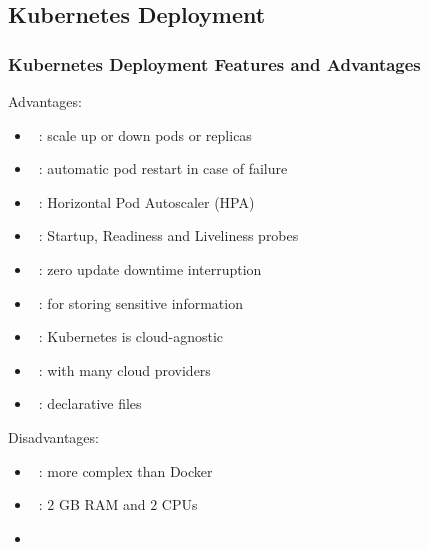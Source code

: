 \documentclass[xcolor=table,fontsize=10pt]{beamer}
\newcommand{\checkeditem}{\item[$\textcolor{green}{\checkmark}$]}
\newcommand{\negitem}{\item[\red{\faIcon{minus}}]}
\begin{document}
\begin{frame}
\begin{center}
\begin{adjustbox}{max width=\textwidth}
\end{adjustbox}
\end{center}


\end{frame}
\subsection{Kubernetes Deployment}
\begin{frame}
	\frametitle{Kubernetes Deployment Features and Advantages}

	Advantages:
	\begin{itemize}
		\checkeditem\ : scale up or down pods or replicas
		\checkeditem\ : automatic pod restart in case of failure
		\checkeditem\ : Horizontal Pod Autoscaler (HPA)
		\checkeditem\ : Startup, Readiness and Liveliness probes
		\checkeditem\ : zero update downtime	interruption
		\checkeditem\ : for storing sensitive information
		\checkeditem\ : Kubernetes is cloud-agnostic
		\checkeditem\ : with many cloud providers
		\checkeditem\ : declarative  files
	\end{itemize}

	Disadvantages:
	\begin{itemize}
		\negitem\ : more complex than Docker
		\negitem\ : $2$ GB RAM and $2$ CPUs
		\item[\empty]
	\end{itemize}

\end{frame}
\end{document}
